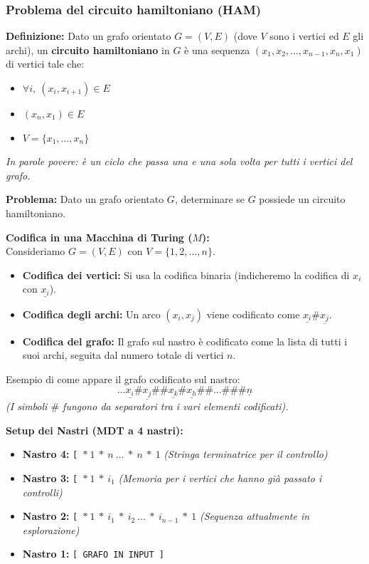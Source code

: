 \subsubsection{Problema del circuito hamiltoniano (HAM)}

\textbf{Definizione:} Dato un grafo orientato $G = (V, E)$ (dove $V$ sono i vertici ed $E$ gli archi), un \textbf{circuito hamiltoniano} in $G$ è una sequenza $(x_1, x_2, \dots, x_{n-1}, x_n, x_1)$ di vertici tale che:
\begin{itemize}
    \item $\forall i, \ (x_i, x_{i+1}) \in E$
    \item $(x_n, x_1) \in E$
    \item $V = \{x_1, \dots, x_n\}$
\end{itemize}
\textit{In parole povere: è un ciclo che passa una e una sola volta per tutti i vertici del grafo.}

\vspace{0.3cm}
\textbf{Problema:} Dato un grafo orientato $G$, determinare se $G$ possiede un circuito hamiltoniano.

\vspace{0.4cm}
\textbf{Codifica in una Macchina di Turing ($M$):} \\
Consideriamo $G = (V,E)$ con $V = \{1, 2, \dots, n\}$.
\begin{itemize}
    \item \textbf{Codifica dei vertici:} Si usa la codifica binaria (indicheremo la codifica di $x_i$ con $\underline{x_i}$).
    \item \textbf{Codifica degli archi:} Un arco $(x_i, x_j)$ viene codificato come $\underline{x_i} \# \underline{x_j}$.
    \item \textbf{Codifica del grafo:} Il grafo sul nastro è codificato come la lista di tutti i suoi archi, seguita dal numero totale di vertici $n$.
\end{itemize}

Esempio di come appare il grafo codificato sul nastro:
$$ \dots \underline{x_i} \# \underline{x_j} \#\# \underline{x_k} \# \underline{x_h} \#\# \dots \#\#\# \underline{n} $$
\textit{(I simboli $\#$ fungono da separatori tra i vari elementi codificati).}

\vspace{0.6cm}


\textbf{Setup dei Nastri (MDT a 4 nastri):}
\begin{itemize}
    \item \textbf{Nastro 4:} \texttt{[ $\ast \ 1 \ \ast \ n \ \dots \ \ast \ n \ \ast \ 1$} \quad \textit{(Stringa terminatrice per il controllo)}
    \item \textbf{Nastro 3:} \texttt{[ $\ast \ 1 \ \ast \ i_1$} \quad \textit{(Memoria per i vertici che hanno già passato i controlli)}
    \item \textbf{Nastro 2:} \texttt{[ $\ast \ 1 \ \ast \ i_1 \ \ast \ i_2 \ \dots \ \ast \ i_{n-1} \ \ast \ 1$} \quad \textit{(Sequenza attualmente in esplorazione)}
    \item \textbf{Nastro 1:} \texttt{[ GRAFO IN INPUT ]}
\end{itemize}

